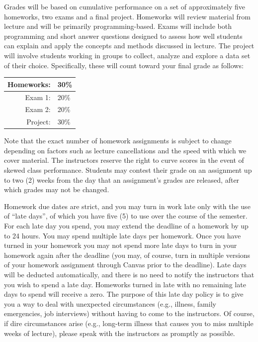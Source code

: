 \documentclass[11pt,oneside]{amsart}
\begin{document}
Grades will be based on cumulative performance on a set of approximately five homeworks, two exams and a final project.
Homeworks will review material from lecture and will be primarily programming-based.
Exams will include both programming and short answer questions designed to assess how well students can explain and apply the concepts and methods discussed in lecture.
The project will involve students working in groups to collect, analyze and explore a data set of their choice.
Specifically, these will count toward your final grade as follows:
\begin{center}
\begin{tabular}{| r | l |}
\hline
Homeworks: &30\% \\
\hline
Exam 1: & 20\% \\
\hline
Exam 2: & 20\% \\
\hline
Project: & 30\% \\
\hline
\end{tabular}
\end{center}

Note that the exact number of homework assignments is subject to change depending on factors such as lecture cancellations and the speed with which we cover material.
The instructors reserve the right to curve scores in the event of skewed class performance.
Students may contest their grade on an assignment up to two (2) weeks from the day that an assignment's grades are released, after which grades may not
be changed.

Homework due dates are strict, and you may turn in work late only with the use of ``late days'', of which you have five (5) to use over the course of the semester.
For each late day you spend, you may extend the deadline of a homework by up to 24 hours.
You may spend multiple late days per homework.
Once you have turned in your homework you may not spend more late days to turn in your homework again after the deadline (you may, of course, turn in multiple versions of your homework assignment through Canvas prior to the deadline).
Late days will be deducted automatically, and there is no need to notify the instructors that you wish to spend a late day.
Homeworks turned in late with no remaining late days to spend will receive a zero.
The purpose of this late day policy is to give you a way to deal with unexpected circumstances (e.g., illness, family emergencies, job interviews) without having to come to the instructors.
Of course, if dire circumstances arise (e.g., long-term illness that causes you to miss multiple weeks of lecture), please speak with the instructors as promptly as possible.
\end{document}
